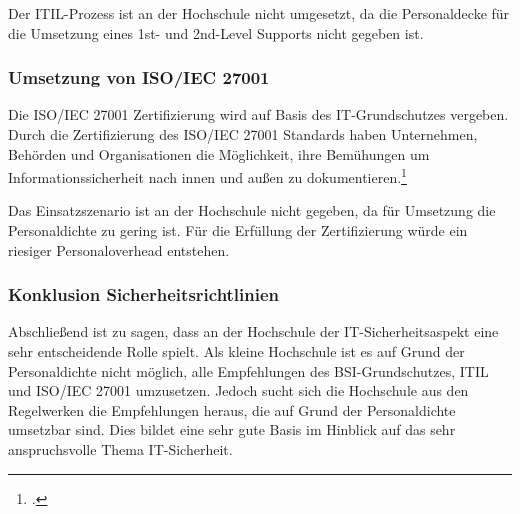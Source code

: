 Der ITIL-Prozess ist an der Hochschule nicht umgesetzt, da die Personaldecke für die Umsetzung eines 1st- und 2nd-Level Supports nicht gegeben ist.

\subsubsection{Umsetzung von ISO/IEC 27001}
Die ISO/IEC 27001 Zertifizierung wird auf Basis des IT-Grundschutzes vergeben. Durch die Zertifizierung des ISO/IEC 27001 Standards haben Unternehmen, Behörden und Organisationen die Möglichkeit, ihre Bemühungen um Informationssicherheit nach innen und außen zu dokumentieren.\footcite[Vgl.][]{iso_27001_bsi.bund.de_2015}

Das Einsatzszenario ist an der Hochschule nicht gegeben, da für Umsetzung die Personaldichte zu gering ist. Für die Erfüllung der Zertifizierung würde ein riesiger Personaloverhead entstehen.

\subsubsection{Konklusion Sicherheitsrichtlinien}
Abschließend ist zu sagen, dass an der Hochschule der IT-Sicherheitsaspekt eine sehr entscheidende Rolle spielt. Als kleine Hochschule ist es auf Grund der Personaldichte nicht möglich, alle Empfehlungen des BSI-Grundschutzes, ITIL und ISO/IEC 27001 umzusetzen. Jedoch sucht sich die Hochschule aus den Regelwerken die Empfehlungen heraus, die auf Grund der Personaldichte umsetzbar sind. Dies bildet eine sehr gute Basis im Hinblick auf das sehr anspruchsvolle Thema IT-Sicherheit.